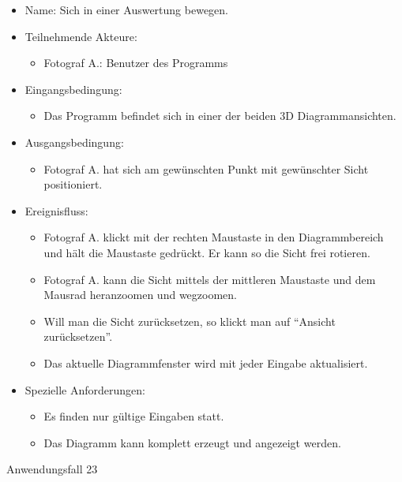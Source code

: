 \begin{itemize}
\item Name: Sich in einer Auswertung bewegen.
\item Teilnehmende Akteure:
\begin{itemize}
\item Fotograf A.: Benutzer des Programms
\end{itemize}
\item Eingangsbedingung:
\begin{itemize}
\item Das Programm befindet sich in einer der beiden 3D Diagrammansichten.
\end{itemize}
\item Ausgangsbedingung:
\begin{itemize}
\item Fotograf A. hat sich am gewünschten Punkt mit gewünschter Sicht positioniert.
\end{itemize}
\item Ereignisfluss:
\begin{itemize}
\item Fotograf A. klickt mit der rechten Maustaste in den Diagrammbereich und hält die Maustaste gedrückt. Er kann so die Sicht frei rotieren.
\item Fotograf A. kann die Sicht mittels der mittleren Maustaste und dem Mausrad heranzoomen und wegzoomen.
\item Will man die Sicht zurücksetzen, so klickt man auf "`Ansicht zurücksetzen"'.
\item Das aktuelle Diagrammfenster wird mit jeder Eingabe aktualisiert.
\end{itemize}
\item Spezielle Anforderungen:
\begin{itemize}
\item Es finden nur gültige Eingaben statt.
\item Das Diagramm kann komplett erzeugt und angezeigt werden.
\end{itemize}
\end{itemize}
 
\begin{description}
\item[Anwendungsfall 23]
\end{description}
 
